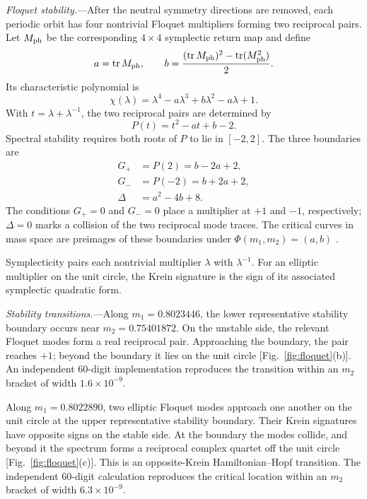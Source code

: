 \documentclass[aps,prl,reprint,amsmath,amssymb]{revtex4-2}
\begin{document}
\emph{Floquet stability.}---After the neutral symmetry directions are removed,
each periodic orbit has four nontrivial Floquet multipliers forming two
reciprocal pairs. Let $M_{\rm ph}$ be the corresponding $4\times4$ symplectic
return map and define
\begin{equation}
a=\operatorname{tr}M_{\rm ph},\qquad
b=\frac{(\operatorname{tr}M_{\rm ph})^2-
\operatorname{tr}(M_{\rm ph}^2)}{2}.
\end{equation}
Its characteristic polynomial is
\begin{equation}
\chi(\lambda)=\lambda^4-a\lambda^3+b\lambda^2-a\lambda+1.
\end{equation}
With $t=\lambda+\lambda^{-1}$, the two reciprocal pairs are determined by
\begin{equation}
P(t)=t^2-at+b-2.
\end{equation}
Spectral stability requires both roots of $P$ to lie in $[-2,2]$. The three
boundaries are
\begin{align}
G_+&=P(2)=b-2a+2,\\
G_-&=P(-2)=b+2a+2,\\
\Delta&=a^2-4b+8.
\end{align}
The conditions $G_+=0$ and $G_-=0$ place a multiplier at $+1$ and $-1$,
respectively; $\Delta=0$ marks a collision of the two reciprocal mode traces.
The critical curves in mass space are preimages of these boundaries under
$\Phi(m_1,m_2)=(a,b)$
\cite{yakubovich1975,howard1987linear,frauenfelder2023symplectic}.

Symplecticity pairs each nontrivial multiplier $\lambda$ with
$\lambda^{-1}$. For an elliptic multiplier on the unit circle, the Krein
signature is the sign of its associated symplectic quadratic form.



\emph{Stability transitions.}---Along $m_1=0.8023446$, the lower representative
stability boundary occurs near $m_2=0.75401872$. On the unstable side, the
relevant Floquet modes form a real reciprocal pair. Approaching the boundary,
the pair reaches $+1$; beyond the boundary it lies on the unit circle
[Fig.~\ref{fig:floquet}(b)]. An independent $60$-digit implementation
reproduces the transition within an $m_2$ bracket of width
$1.6\times10^{-9}$.

Along $m_1=0.8022890$, two elliptic Floquet modes approach one another on the
unit circle at the upper representative stability boundary. Their Krein
signatures have opposite signs on the stable side. At the boundary the modes
collide, and beyond it the spectrum forms a reciprocal complex quartet off the
unit circle [Fig.~\ref{fig:floquet}(c)]. This is an opposite-Krein
Hamiltonian--Hopf transition. The independent $60$-digit calculation
reproduces the critical location within an $m_2$ bracket of width
$6.3\times10^{-9}$.
\end{document}
